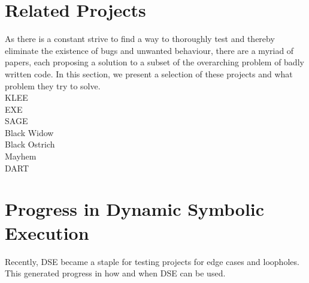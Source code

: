 \section{Related Projects}

As there is a constant strive to find a way to thoroughly test and thereby eliminate the existence of bugs and unwanted behaviour, there are a myriad of papers, each proposing a solution to a subset of the overarching problem of badly written code.  In this section, we present a selection of these projects and what problem they try to solve.\\
KLEE \cite{cadar_klee_nodate}\\
EXE \cite{ball_deconstructing_nodate}\\
SAGE \cite{godefroid_sage_2012}\\
Black Widow \cite{eriksson_black_2021}\\
Black Ostrich \cite{eriksson_black_2023}\\
Mayhem \cite{cha_unleashing_2012}\\
DART  \cite{godefroid_random_2007}\\
\section{Progress in Dynamic Symbolic Execution}

Recently, DSE became a staple for testing projects for edge cases and loopholes. 
This generated progress in how and when DSE can be used. 